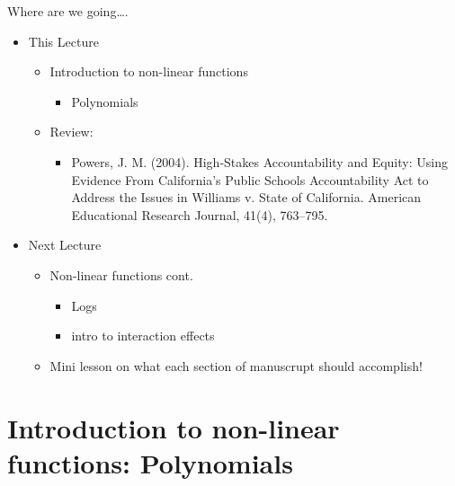 \documentclass[8pt,ignorenonframetext,dvipsnames]{beamer}
\providecommand{\tightlist}{%
  \setlength{\itemsep}{0pt}\setlength{\parskip}{0pt}}
\let\olditem\item
\renewcommand{\item}{%
  \olditem\vspace{4pt}
}
\begin{document}
\begin{frame}{Where are we going\ldots{}.}
\protect\hypertarget{where-are-we-going.}{}

\begin{itemize}
\tightlist
\item
  This Lecture

  \begin{itemize}
  \tightlist
  \item
    Introduction to non-linear functions

    \begin{itemize}
    \tightlist
    \item
      Polynomials
    \end{itemize}
  \item
    Review:

    \begin{itemize}
    \tightlist
    \item
      Powers, J. M. (2004). High-Stakes Accountability and Equity: Using
      Evidence From California's Public Schools Accountability Act to
      Address the Issues in Williams v. State of California. American
      Educational Research Journal, 41(4), 763--795.
    \end{itemize}
  \end{itemize}
\item
  Next Lecture

  \begin{itemize}
  \tightlist
  \item
    Non-linear functions cont.

    \begin{itemize}
    \tightlist
    \item
      Logs
    \item
      intro to interaction effects
    \end{itemize}
  \item
    Mini lesson on what each section of manuscrupt should accomplish!
  \end{itemize}
\end{itemize}

\end{frame}

\hypertarget{introduction-to-non-linear-functions-polynomials}{%
\section{Introduction to non-linear functions:
Polynomials}\label{introduction-to-non-linear-functions-polynomials}}
\end{document}
